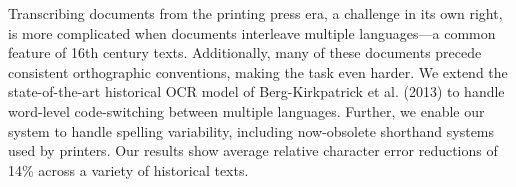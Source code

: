 Transcribing documents from the printing press era, a challenge in its own right, is more complicated when documents interleave multiple languages---a common feature of 16th century texts. Additionally, many of these documents precede consistent orthographic conventions, making the task even harder. We extend the state-of-the-art historical OCR model of Berg-Kirkpatrick et al. (2013) to handle word-level code-switching between multiple languages. Further, we enable our system to handle spelling variability, including now-obsolete shorthand systems used by printers. Our results show average relative character error reductions of 14\% across a variety of historical texts.
